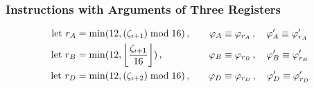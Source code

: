 \subsubsection{Instructions with Arguments of Three Registers}
\begin{equation}
\begin{aligned}
  \using r_A &= \min(12, (\instructions_{\imath+1}) \bmod 16) \,,\quad&
  \reg_A &\equiv \reg_{r_A} \,,\quad
  \reg'_A \equiv \reg'_{r_A} \\
  \using r_B &= \min(12, \ffrac{\instructions_{\imath+1}}{16}) \,,\quad&
  \reg_B &\equiv \reg_{r_B} \,,\quad
  \reg'_B \equiv \reg'_{r_B} \\
  \using r_D &= \min(12, (\instructions_{\imath+2}) \bmod 16) \,,\quad&
  \reg_D &\equiv \reg_{r_D} \,,\quad
  \reg'_D \equiv \reg'_{r_D} \\
\end{aligned}
\end{equation}

